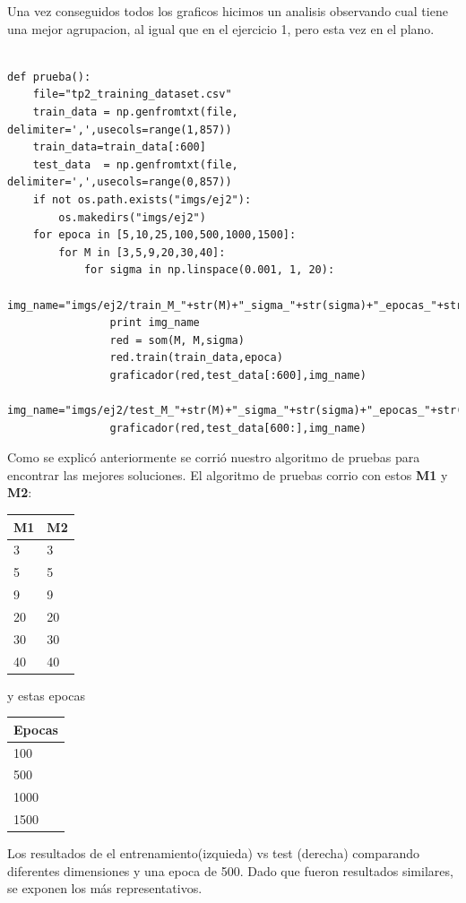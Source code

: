 Una vez conseguidos todos los graficos hicimos un analisis observando cual tiene una mejor agrupacion, al igual que en el ejercicio 1, pero esta vez en el plano.


\begin{lstlisting}[caption=pruebas]
	
def prueba():
	file="tp2_training_dataset.csv"
	train_data = np.genfromtxt(file, delimiter=',',usecols=range(1,857))
	train_data=train_data[:600]
	test_data  = np.genfromtxt(file, delimiter=',',usecols=range(0,857))
	if not os.path.exists("imgs/ej2"):
		os.makedirs("imgs/ej2")
	for epoca in [5,10,25,100,500,1000,1500]:
		for M in [3,5,9,20,30,40]:
			for sigma in np.linspace(0.001, 1, 20):
				img_name="imgs/ej2/train_M_"+str(M)+"_sigma_"+str(sigma)+"_epocas_"+str(epoca)+".png"
				print img_name
				red = som(M, M,sigma)
				red.train(train_data,epoca)
				graficador(red,test_data[:600],img_name)
				img_name="imgs/ej2/test_M_"+str(M)+"_sigma_"+str(sigma)+"_epocas_"+str(epoca)+".png"
				graficador(red,test_data[600:],img_name)

\end{lstlisting}

Como se explic\'o anteriormente se corri\'o nuestro algoritmo de pruebas para encontrar las mejores soluciones. El algoritmo de pruebas corrio con estos \textbf{M1} y \textbf{M2}:

\begin{tabular}{|l|l|}
\hline
M1 & M2 \\ \hline
3 & 3 \\ \hline
5 & 5 \\ \hline
9 & 9 \\ \hline
20 & 20 \\ \hline
30 & 30 \\ \hline
40 & 40 \\ \hline
\end{tabular}

y estas epocas
\begin{tabular}{|l|}
\hline
Epocas\\ \hline
100 \\ \hline
500 \\ \hline
1000 \\ \hline
1500 \\ \hline
\end{tabular}

Los resultados de el entrenamiento(izquieda) vs test (derecha) comparando diferentes dimensiones y una epoca de 500. Dado que fueron resultados similares, se exponen los m\'as representativos.

